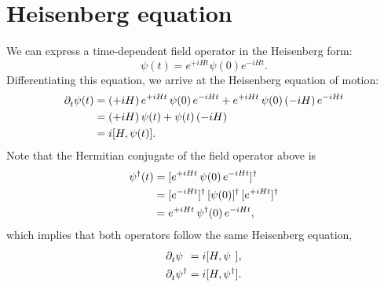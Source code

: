 \section{Heisenberg equation}
We can express a time-dependent field operator in the Heisenberg form:
\begin{equation}
  \psi(t) = e^{+iHt} \psi(0) e^{-iHt} .
\end{equation}
Differentiating this equation, we arrive at the Heisenberg equation of motion:
\begin{align}
  \partial^{}_{t}\psi(t) 
  &= (+iH)\, e^{+iHt}\, \psi(0) \, e^{-iHt} + e^{+iHt} \, \psi(0) \,(-iH)\, e^{-iHt} \\
  &= (+iH)\, \psi(t) + \psi(t) \,(-iH) \\
  &= i[H,\psi(t)] .
\end{align}
Note that the Hermitian conjugate of the field operator above is
\begin{align}
  \psi^{\dagger}(t) 
  &= [e^{+iHt} \,\psi(0)\, e^{-iHt}]^{\dagger} \\
  &= [e^{-iHt}]^{\dagger} \, [\psi(0)]^{\dagger} \, [e^{+iHt}]^{\dagger} \\
  &= e^{+iHt} \, \psi^{\dagger}(0) \, e^{-iHt},
\end{align}
which implies that both operators follow the same Heisenberg equation,
\begin{align}
  \p{t}\pc{\psi} &= i[H,\pc{\psi}] , \\
  \p{t}\hc{\psi} &= i[H,\hc{\psi}] .
\end{align}

